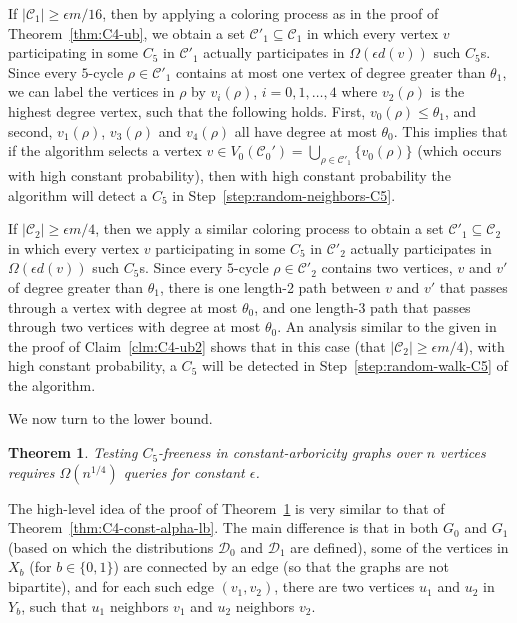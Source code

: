\documentclass{article}
\newcommand{\eps}{\epsilon}
\newcommand{\calC}{{\mathcal{C}}}
\newcommand{\calD}{{\mathcal{D}}}
\newtheorem{theorem}{Theorem}
\newcommand{\commentt}[1]{ {}}
\newcommand{\ForFuture}[1]{}
\begin{document}
If $|\calC_1|\geq \eps m/16$, then by applying a coloring process as in the proof of Theorem~\ref{thm:C4-ub}, we obtain a set $\calC'_1\subseteq \calC_1$
in which every vertex $v$ participating in some $C_5$ in $\calC'_1$ actually participates in  $\Omega(\eps d(v))$ such $C_5$s. Since every $5$-cycle $\rho\in \calC'_1$ contains at most one vertex of degree greater than $\theta_1$, we can label the vertices in $\rho$ by $v_i(\rho)$, $i=0,1,\dots,4$ where $v_2(\rho)$ is the highest degree vertex, such that the following holds. First, $v_0(\rho) \leq \theta_1$, and second, $v_1(\rho)$, $v_3(\rho)$ and $v_4(\rho)$ all have degree at most $\theta_0$. This implies that if the algorithm selects a vertex $v \in V_0(\calC_0') = \bigcup_{\rho\in \calC'_1} \{v_0(\rho)\}$ (which occurs with high constant probability), then with high constant probability the algorithm will detect a $C_5$ 
in Step~\ref{step:random-neighbors-C5}.

If $|\calC_2| \geq \eps m/4$, then we apply a similar coloring process to obtain a set $\calC'_1\subseteq \calC_2$
in which every vertex $v$ participating in some $C_5$ in $\calC'_2$ actually participates in  $\Omega(\eps d(v))$ such $C_5$s. Since every $5$-cycle $\rho\in \calC'_2$ contains two vertices, $v$ and $v'$ of degree greater than $\theta_1$, there is one length-2 path between $v$ and $v'$ that passes through a vertex with degree at most $\theta_0$, and one length-3 path that passes through two vertices with degree at most $\theta_0$. An analysis similar to the given in the proof of Claim~\ref{clm:C4-ub2} shows that in this case (that $|\calC_2| \geq \eps m/4$), with high constant probability, a $C_5$ will be detected in Step~\ref{step:random-walk-C5} of the algorithm.
\ForFuture{T; elaborate a bit more}


\medskip\noindent
We now turn to the lower bound.
\begin{theorem} \label{thm:C5-const-alpha-lb}
Testing $C_5$-freeness in constant-arboricity graphs over $n$ vertices requires $\Omega(n^{1/4})$ queries for constant $\epsilon$.
\end{theorem}

The high-level idea of the proof of Theorem~\ref{thm:C5-const-alpha-lb} is very similar to that of Theorem~\ref{thm:C4-const-alpha-lb}. The main difference is that in both $G_0$ and $G_1$ (based on which the distributions $\calD_0$ and $\calD_1$ are defined), 
some of the vertices in $X_b$ (for $b\in \{0,1\}$) are connected by an edge (so that the graphs are not bipartite),
and for each such edge $(v_1,v_2)$, there are two vertices $u_1$ and $u_2$ in $Y_b$, such that $u_1$ neighbors $v_1$ and $u_2$ neighbors $v_2$.
\end{document}
